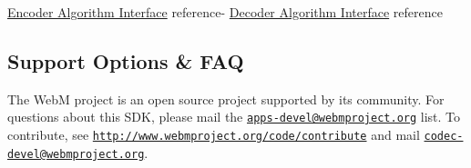 \hyperlink{group__encoder}{\-Encoder \-Algorithm \-Interface} reference-\/ \hyperlink{group__decoder}{\-Decoder \-Algorithm \-Interface} reference \hypertarget{index_main_support}{}\subsection{\-Support Options \& F\-A\-Q}\label{index_main_support}
\-The \-Web\-M project is an open source project supported by its community. \-For questions about this \-S\-D\-K, please mail the \href{mailto:apps-devel@webmproject.org}{\tt apps-\/devel@webmproject.\-org} list. \-To contribute, see \href{http://www.webmproject.org/code/contribute}{\tt http\-://www.\-webmproject.\-org/code/contribute} and mail \href{mailto:codec-devel@webmproject.org}{\tt codec-\/devel@webmproject.\-org}. 